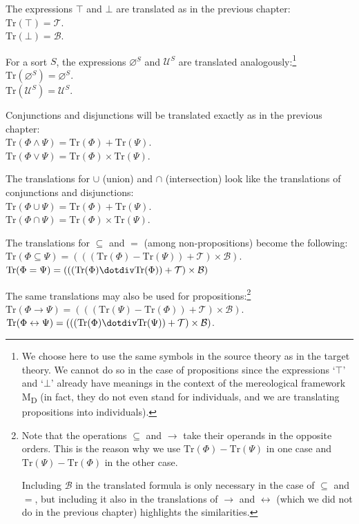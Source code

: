 \documentclass[12pt]{book}
\begin{document}
The expressions $\top$ and $\bot$ are translated as in the previous chapter:\\
\indent * $\mathrm{Tr}(\top) = \mathcal{T}$.\\
\indent * $\mathrm{Tr}(\bot) = \mathcal{B}$.

For a sort $S$, the expressions $\varnothing^S$ and $\mathcal{U}^S$ are translated analogously:\footnote{We choose here to use the same symbols in the source theory as in the target theory. We cannot do so in the case of propositions since the expressions `$\top$' and `$\bot$' already have meanings in the context of the mereological framework M\textsubscript{D} (in fact, they do not even stand for individuals, and we are translating propositions into individuals).}\\
\indent * $\mathrm{Tr}(\varnothing^S) = \varnothing^S$.\\
\indent * $\mathrm{Tr}(\mathcal{U}^S) = \mathcal{U}^S$.

Conjunctions and disjunctions will be translated exactly as in the previous chapter:\\
\indent * $\mathrm{Tr}(\Phi \wedge \Psi) = \mathrm{Tr}(\Phi) + \mathrm{Tr}(\Psi)$.\\
\indent * $\mathrm{Tr}(\Phi \vee \Psi) = \mathrm{Tr}(\Phi) \times \mathrm{Tr}(\Psi)$.

The translations for $\cup$ (union) and $\cap$ (intersection) look like the translations of conjunctions and disjunctions:\\
\indent * $\mathrm{Tr}(\Phi \cup \Psi) = \mathrm{Tr}(\Phi) + \mathrm{Tr}(\Psi)$.\\
\indent * $\mathrm{Tr}(\Phi \cap \Psi) = \mathrm{Tr}(\Phi) \times \mathrm{Tr}(\Psi)$.

The translations for $\subseteq$ and $=$ (among non-propositions) become the following:\\
\indent * $\mathrm{Tr}(\Phi \subseteq \Psi) = (((\mathrm{Tr}(\Phi) - \mathrm{Tr}(\Psi)) + \mathcal{T}) \times \mathcal{B})$.\\
\indent * $\mathrm{Tr}(\Phi = \Psi) = (((\mathrm{Tr}(\Phi) \dotdiv \mathrm{Tr}(\Phi)) + \mathcal{T}) \times \mathcal{B})$

The same translations may also be used for propositions:\footnote{Note that the operations $\subseteq$ and $\rightarrow$ take their operands in the opposite orders. This is the reason why we use $\mathrm{Tr}(\Phi) - \mathrm{Tr}(\Psi)$ in one case and $\mathrm{Tr}(\Psi) - \mathrm{Tr}(\Phi)$ in the other case.

Including $\mathcal{B}$ in the translated formula is only necessary in the case of $\subseteq$ and $=$, but including it also in the translations of $\rightarrow$ and $\leftrightarrow$ (which we did not do in the previous chapter) highlights the similarities.}\\ 
\indent * $\mathrm{Tr}(\Phi \rightarrow \Psi) = (((\mathrm{Tr}(\Psi) - \mathrm{Tr}(\Phi)) + \mathcal{T}) \times \mathcal{B})$.\\
\indent * $\mathrm{Tr}(\Phi \leftrightarrow \Psi) = (((\mathrm{Tr}(\Phi) \dotdiv \mathrm{Tr}(\Psi)) + \mathcal{T}) \times \mathcal{B})$.
\end{document}
